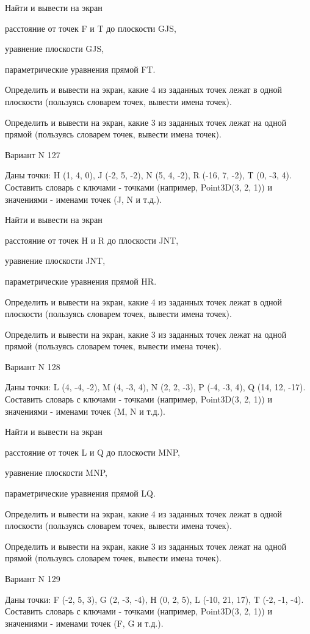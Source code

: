 \documentclass[11pt]{report}
\begin{document}
Найти и вывести на экран


расстояние от точек F и T до плоскости GJS,


уравнение плоскости GJS,


параметрические уравнения прямой FT.


Определить и вывести на экран, какие 4 из заданных точек лежат в одной плоскости (пользуясь словарем точек, вывести имена точек).


Определить и вывести на экран, какие 3 из заданных точек лежат на одной прямой (пользуясь словарем точек, вывести имена точек).

\newpage
Вариант N 127

Даны точки: H (1, 4, 0), J (-2, 5, -2), N (5, 4, -2), R (-16, 7, -2), T (0, -3, 4).
Составить словарь с ключами - точками (например, Point3D(3, 2, 1)) и значениями - именами точек (J, N и т.д.).


Найти и вывести на экран


расстояние от точек H и R до плоскости JNT,


уравнение плоскости JNT,


параметрические уравнения прямой HR.


Определить и вывести на экран, какие 4 из заданных точек лежат в одной плоскости (пользуясь словарем точек, вывести имена точек).


Определить и вывести на экран, какие 3 из заданных точек лежат на одной прямой (пользуясь словарем точек, вывести имена точек).

\newpage
Вариант N 128

Даны точки: L (4, -4, -2), M (4, -3, 4), N (2, 2, -3), P (-4, -3, 4), Q (14, 12, -17).
Составить словарь с ключами - точками (например, Point3D(3, 2, 1)) и значениями - именами точек (M, N и т.д.).


Найти и вывести на экран


расстояние от точек L и Q до плоскости MNP,


уравнение плоскости MNP,


параметрические уравнения прямой LQ.


Определить и вывести на экран, какие 4 из заданных точек лежат в одной плоскости (пользуясь словарем точек, вывести имена точек).


Определить и вывести на экран, какие 3 из заданных точек лежат на одной прямой (пользуясь словарем точек, вывести имена точек).

\newpage
Вариант N 129

Даны точки: F (-2, 5, 3), G (2, -3, -4), H (0, 2, 5), L (-10, 21, 17), T (-2, -1, -4).
Составить словарь с ключами - точками (например, Point3D(3, 2, 1)) и значениями - именами точек (F, G и т.д.).
\end{document}
